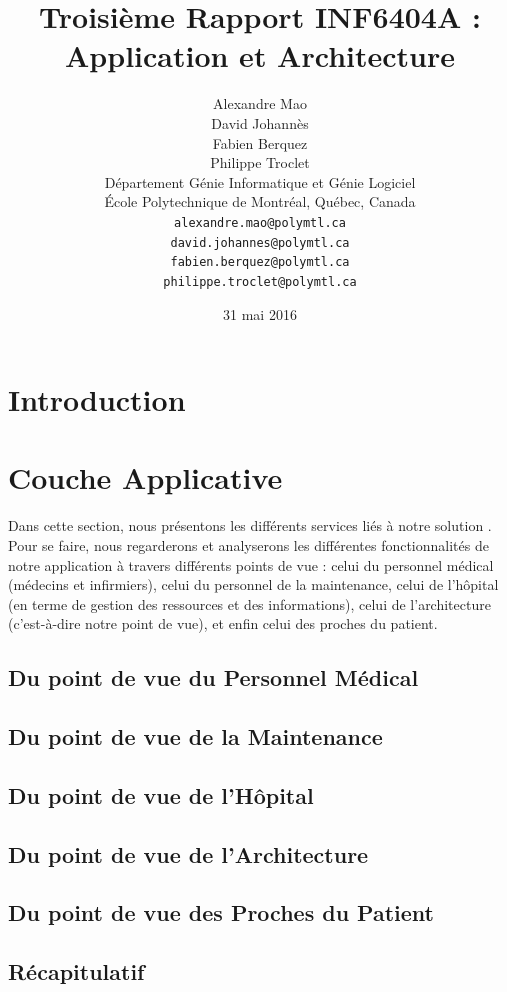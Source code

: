 \documentclass{article}
\title{Troisième Rapport INF6404A : Application et Architecture}
\author{
	Alexandre Mao\\
	David Johannès \\
	Fabien Berquez \\
	Philippe Troclet \\
	D\'{e}partement G\'{e}nie Informatique et G\'{e}nie Logiciel \\
	\'{E}cole Polytechnique de Montr\'{e}al, Qu\'{e}bec, Canada \\
	\texttt{alexandre.mao@polymtl.ca}\\
	\texttt{david.johannes@polymtl.ca}\\
	\texttt{fabien.berquez@polymtl.ca}   \\
	\texttt{philippe.troclet@polymtl.ca}   \\
}
\date{31 mai 2016}
\begin{document}
\maketitle

\section{Introduction}


 
\section{Couche Applicative}
Dans cette section, nous présentons les différents services liés à notre solution \cite{vermesan2014internet} \cite{catarinucci2015iot}. Pour se faire, nous regarderons et analyserons les différentes fonctionnalités de notre application à travers différents points de vue : celui du personnel médical (médecins et infirmiers), celui du personnel de la maintenance, celui de l'hôpital (en terme de gestion des ressources et des informations), celui de l'architecture (c'est-à-dire notre point de vue), et enfin celui des proches du patient.

\subsection{Du point de vue du Personnel Médical}

\subsection{Du point de vue de la Maintenance}

\subsection{Du point de vue de l'Hôpital}

\subsection{Du point de vue de l'Architecture}

\subsection{Du point de vue des Proches du Patient}

\subsection{Récapitulatif}

\end{document}
